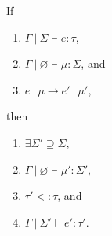 \documentclass{llncs}
\begin{document}
\vspace{15pt}

\begin{theorem}[Preservation]
If
\begin{enumerate}
\item $\Gamma~|~\Sigma \vdash e : \tau$,
\item $\Gamma~|~\varnothing \vdash \mu : \Sigma$, and
\item $e~|~\mu \rightarrow e'~|~\mu'$,
\end{enumerate}
then
\begin{enumerate}
\item $\exists \Sigma' \supseteq \Sigma$,
\item $\Gamma~|~\varnothing \vdash \mu' : \Sigma'$,
\item $\tau'<:\tau$, and
\item $\Gamma~|~\Sigma' \vdash e' : \tau'$.
\end{enumerate}

\end{theorem}


\vspace{15pt}
\end{document}
